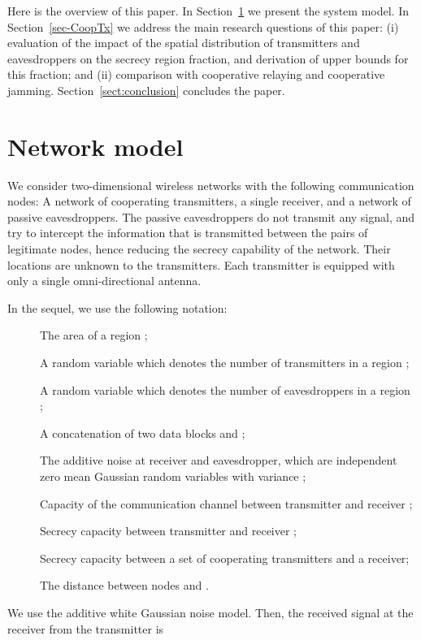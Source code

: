\documentclass[conference,a4paper]{IEEEtran}
\begin{document}
Here is the overview of this paper.
In Section~\ref{sec:system_model} we present the system model. 
In Section~\ref{sec-CoopTx} we address the main research questions of this paper: (i) evaluation of the impact of the spatial distribution of transmitters and eavesdroppers on the secrecy region fraction, and derivation of upper bounds for this fraction; 
and (ii) comparison with cooperative relaying and cooperative jamming.
Section~\ref{sect:conclusion} concludes the paper.


\section{Network model} \label{sec:system_model}


We consider two-dimensional wireless networks with the following communication nodes: A network of  cooperating transmitters, a single receiver, 
and a network of  passive eavesdroppers.
The passive eavesdroppers do not transmit any signal, and try to intercept the information that is transmitted between the pairs of legitimate
nodes, hence reducing the secrecy capability of the network.
Their locations are unknown to the transmitters.
Each transmitter is equipped with only a single omni-directional antenna.


In the sequel, we use the following notation:
\begin{description}
\item [] The area of a region ;
\item [] A random variable which denotes the number of transmitters in a region ;
\item [] A random variable which denotes the number of eavesdroppers in a region ;
\item [] A concatenation of two data blocks  and ;
\item[] The additive noise at receiver and eavesdropper, which are independent zero mean Gaussian random variables with variance ;
\item[] Capacity of the communication channel between transmitter  and receiver ;
\item[] Secrecy capacity between transmitter  and receiver ;
\item[] Secrecy capacity between a set of cooperating transmitters and a receiver;
\item[] The distance between nodes  and .
\end{description}

We use the additive white Gaussian noise model.
Then, the received signal at the receiver  from the transmitter  is 
\end{document}
